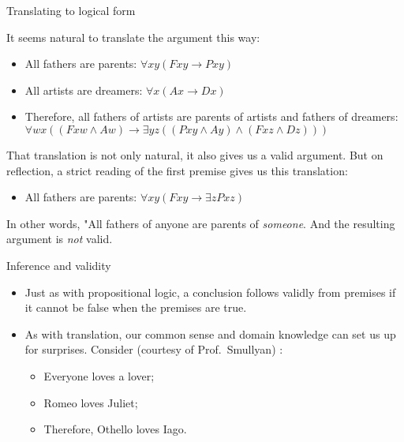 \documentclass[
  ignorenonframetext,
]{beamer}
\providecommand{\tightlist}{%
  \setlength{\itemsep}{0pt}\setlength{\parskip}{0pt}}
\begin{document}
\begin{frame}{Translating to logical form}
\protect\hypertarget{translating-to-logical-form-1}{}

It seems natural to translate the argument this way:

\begin{itemize}[<+->]
\tightlist
\item
  All fathers are parents: \({\forall}xy (Fxy \rightarrow Pxy)\)
\item
  All artists are dreamers: \({\forall}x (Ax \rightarrow Dx)\)
\item
  Therefore, all fathers of artists are parents of artists and fathers
  of dreamers:
  \({\forall}wx ((Fxw \wedge Aw) \rightarrow {\exists}yz ((Pxy \wedge Ay) \wedge (Fxz \wedge Dz)))\)
\end{itemize}

\pause

That translation is not only natural, it also gives us a valid argument.
But on reflection, a strict reading of the first premise gives us this
translation:

\pause

\begin{itemize}[<+->]
\tightlist
\item
  All fathers are parents:
  \({\forall}xy (Fxy \rightarrow {\exists}z Pxz)\)
\end{itemize}

\pause

In other words, "All fathers of anyone are parents of \emph{someone}.
And the resulting argument is \emph{not} valid.

\end{frame}

\begin{frame}[fragile]{Inference and validity}
\protect\hypertarget{inference-and-validity}{}

\begin{itemize}[<+->]
\item
  Just as with propositional logic, a conclusion follows validly from
  premises if it cannot be false when the premises are true.
\item
  As with translation, our common sense and domain knowledge can set us
  up for surprises. Consider (courtesy of Prof.~Smullyan) :
\begin{itemize}
 \item Everyone loves a lover;
 \item Romeo loves Juliet;
 \item Therefore, Othello loves Iago.
\end{itemize}
\end{itemize}

\end{frame}
\end{document}
